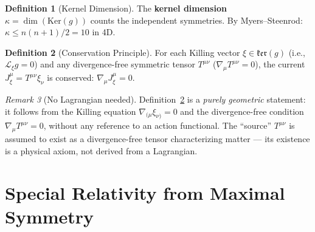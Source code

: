\documentclass[11pt,twocolumn]{article}
\theoremstyle{plain}\newtheorem{theorem}{Theorem}\newtheorem{proposition}[theorem]{Proposition}\newtheorem{corollary}[theorem]{Corollary}\newtheorem{lemma}[theorem]{Lemma}
\theoremstyle{definition}\newtheorem{definition}[theorem]{Definition}
\theoremstyle{remark}\newtheorem{remark}[theorem]{Remark}
\newcommand{\Ker}{\mathrm{Ker}}
\begin{document}
\begin{definition}[Kernel Dimension]\label{def:kappa}
The \textbf{kernel dimension} $\kappa = \dim(\Ker(g))$ counts the independent symmetries. By Myers--Steenrod: $\kappa \leq n(n+1)/2 = 10$ in 4D.
\end{definition}

\begin{definition}[Conservation Principle]\label{def:conservation}
For each Killing vector $\xi \in \mathfrak{ker}(g)$ (i.e., $\mathcal{L}_\xi g = 0$) and any divergence-free symmetric tensor $T^{\mu\nu}$ ($\nabla_\mu T^{\mu\nu} = 0$), the current $J^\mu_\xi = T^{\mu\nu}\xi_\nu$ is conserved: $\nabla_\mu J^\mu_\xi = 0$.
\end{definition}

\begin{remark}[No Lagrangian needed]
Definition~\ref{def:conservation} is a \emph{purely geometric} statement: it follows from the Killing equation $\nabla_{(\mu}\xi_{\nu)} = 0$ and the divergence-free condition $\nabla_\mu T^{\mu\nu} = 0$, without any reference to an action functional. The ``source'' $T^{\mu\nu}$ is assumed to exist as a divergence-free tensor characterizing matter --- its existence is a physical axiom, not derived from a Lagrangian.
\end{remark}


\section{Special Relativity from Maximal Symmetry}
\label{sec:SR}
\end{document}
